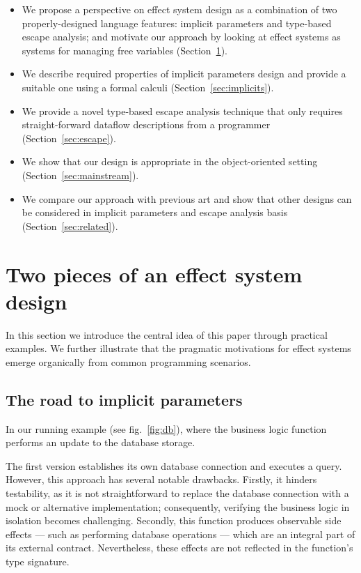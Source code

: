 \documentclass[acmsmall,review,screen]{acmart}
\begin{document}
\begin{itemize} %
    \item We propose a perspective on effect system design as a combination of two properly-designed language features: implicit parameters and type-based escape analysis; and motivate our approach by looking at effect systems as systems for managing free variables (Section~\ref{sec:idea}).
    \item We describe required properties of implicit parameters design and provide a suitable one using a formal calculi (Section~\ref{sec:implicits}).
    \item We provide a novel type-based escape analysis technique that only requires straight-forward dataflow descriptions from a programmer (Section~\ref{sec:escape}).
    \item We show that our design is appropriate in the object-oriented setting (Section~\ref{sec:mainstream}). %
    \item We compare our approach with previous art and show that other designs can be considered in implicit parameters and escape analysis basis (Section~\ref{sec:related}).
\end{itemize}


\section{Two pieces of an effect system design} \label{sec:idea}

In this section we introduce the central idea of this paper through practical examples.
We further illustrate that the pragmatic motivations for effect systems emerge organically from common programming scenarios.

\subsection{The road to implicit parameters} \label{subsec:implicits}

In our running example (see fig.\ \ref{fig:db}), where the business logic function performs an update to the database storage.

The first version establishes its own database connection and executes a query.
However, this approach has several notable drawbacks.
Firstly, it hinders testability, as it is not straightforward to replace the database connection with a mock or alternative implementation; consequently, verifying the business logic in isolation becomes challenging.
Secondly, this function produces observable side effects --- such as performing database operations --- which are an integral part of its external contract.
Nevertheless, these effects are not reflected in the function’s type signature.
\end{document}
